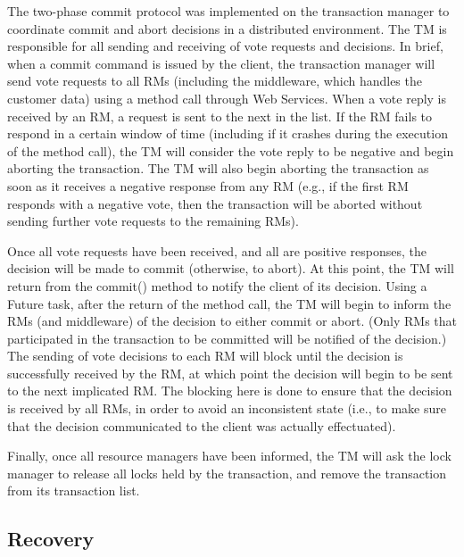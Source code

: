 \documentclass[11pt]{article}
\begin{document}
The two-phase commit protocol was implemented on the transaction manager to coordinate commit and abort decisions in a distributed environment. The TM is responsible for all sending and receiving of vote requests and decisions. In brief, when a commit command is issued by the client, the transaction manager will send vote requests to all RMs (including the middleware, which handles the customer data) using a method call through Web Services. When a vote reply is received by an RM, a request is sent to the next in the list. If the RM fails to respond in a certain window of time (including if it crashes during the execution of the method call), the TM will consider the vote reply to be negative and begin aborting the transaction. The TM will also begin aborting the transaction as soon as it receives a negative response from any RM (e.g., if the first RM responds with a negative vote, then the transaction will be aborted without sending further vote requests to the remaining RMs).  \par

Once all vote requests have been received, and all are positive responses, the decision will be made to commit (otherwise, to abort). At this point, the TM will return from the commit() method to notify the client of its decision. Using a Future task, after the return of the method call, the TM will begin to inform the RMs (and middleware) of the decision to either commit or abort. (Only RMs that participated in the transaction to be committed will be notified of the decision.) The sending of vote decisions to each RM will block until the decision is successfully received by the RM, at which point the decision will begin to be sent to the next implicated RM. The blocking here is done to ensure that the decision is received by all RMs, in order to avoid an inconsistent state (i.e., to make sure that the decision communicated to the client was actually effectuated).  \par

Finally, once all resource managers have been informed, the TM will ask the lock manager to release all locks held by the transaction, and remove the transaction from its transaction list.  \par

\subsection*{Recovery}
\end{document}
